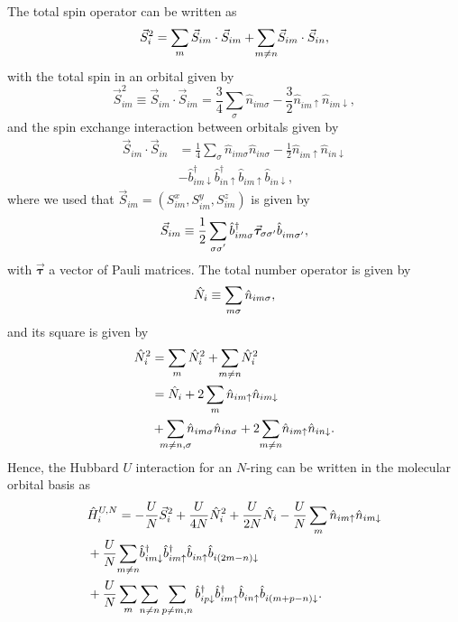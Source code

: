 \documentclass[reprint,aps,prb,amsmath,amssymb]{revtex4-2}
\begin{document}
The total spin operator can be written as
%
\begin{equation}
\vec{S}_i^2 = \sum_{m} \vec{S}_{im} \cdot \vec{S}_{im} + \sum_{ \mathclap{m \neq n} } \vec{S}_{im} \cdot \vec{S}_{in},
\end{equation}
%
with the total spin in an orbital given by
%
\begin{equation}
\vec{S}_{im}^2 \equiv \vec{S}_{im} \cdot \vec{S}_{im} = \frac{3}{4} \sum_{\sigma} \hat{n}_{im\sigma} - \frac{3}{2} \hat{n}_{im\uparrow} \hat{n}_{im \downarrow},
\end{equation}
%
and the spin exchange interaction between orbitals given by
%
\begin{align}
\vec{S}_{im} \cdot \vec{S}_{in} & = \frac{1}{4} \sum_{\sigma} \hat{n}_{im\sigma} \hat{n}_{in\sigma} - \frac{1}{2} \hat{n}_{im\uparrow} \hat{n}_{in \downarrow} \nonumber \\ 
%
& - \hat{b}_{im\downarrow}^{\dagger} \hat{b}_{in \uparrow}^{\dagger} \hat{b}_{im \uparrow}^{} \hat{b}_{in \downarrow}^{},
\end{align}
%
where we used that $\vec{S}_{im} = (S_{im}^x, S_{im}^y, S_{im}^z)$ is given by
%
\begin{equation}
	\vec{S}_{im} \equiv \frac{1}{2} \sum_{ \mathclap{\sigma \sigma' }} \hat{b}_{im \sigma}^{\dagger} \vec{\bm{\tau}}_{\sigma \sigma'} \hat{b}_{im \sigma'}^{},
\end{equation}
%
with $\vec{\bm{\tau}}$ a vector of Pauli matrices. The total number operator is given by
%
\begin{equation}
\hat{N}_i \equiv \sum_{ \mathclap{m\sigma} } \hat{n}_{im\sigma},
\end{equation}
%
and its square is given by 
%
\begin{align}
\hat{N}_i^2 & = \sum_m \hat{N}_i^2 + \sum_{ \mathclap{m\neq n} } \hat{N}_i^{2} \nonumber \\
%
& = \hat{N}_i + 2 \sum_m \hat{n}_{im\uparrow} \hat{n}_{im\downarrow} \nonumber \\
%
& + \sum_{ \mathclap{m\neq n, \sigma} } \hat{n}_{im\sigma} \hat{n}_{in\sigma} + 2 \sum_{ \mathclap{m\neq n} } \hat{n}_{im\uparrow} \hat{n}_{in\downarrow}.
\end{align}
%
Hence, the Hubbard $U$ interaction for an $N$-ring can be written in the molecular orbital basis as
%
\begin{align} \label{eq:N-cyclic-hubb}
& \hat{H}_i^{U,N} = - \frac{U}{N} \vec{S}_i^2 + \frac{U}{4N}  \hat{N}_i^2 + \frac{U}{2N}  \hat{N}_i - \frac{U}{N} \sum_m \hat{n}_{im\uparrow} \hat{n}_{im\downarrow} \nonumber \\
%
& + \frac{U}{N} \sum_{ \mathclap{m \neq n} } \hat{b}_{im\downarrow}^{\dagger} \hat{b}_{im\uparrow}^{\dagger} \hat{b}_{in\uparrow}^{} \hat{b}_{i(2m-n) \downarrow}^{} \nonumber \\
%
& + \frac{U}{N} \sum_m \sum_{n \neq n} \sum_{p \neq m,n}  \hat{b}_{i p \downarrow}^{\dagger} \hat{b}_{i m\uparrow}^{\dagger} \hat{b}_{i n \uparrow}^{} \hat{b}_{i (m + p -n) \downarrow}^{}.
\end{align}
\end{document}
